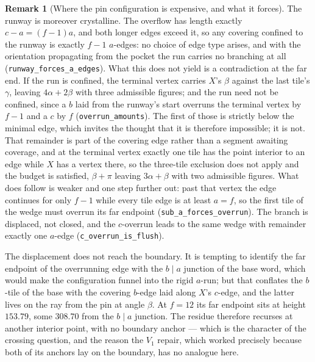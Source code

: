 \documentclass[11pt,reqno]{amsart}
\theoremstyle{plain}
\theoremstyle{definition}
\newtheorem{remark}[theorem]{Remark}
\begin{document}
\begin{remark}[Where the pin configuration is expensive, and what it forces]
The runway is moreover crystalline. The overflow has length exactly $c-a=(f-1)a$, and both longer
edges exceed it, so any covering confined to the runway is exactly $f-1$ $a$-edges: no choice of
edge type arises, and with the orientation propagating from the pocket the run carries no branching
at all (\texttt{runway\_forces\_a\_edges}). What this does not yield is a contradiction at the
far end. If the run is confined, the terminal vertex carries $X$'s $\beta$ against the last tile's
$\gamma$, leaving $4\alpha+2\beta$ with three admissible figures; and the run need not be
confined, since a $b$ laid from the runway's start overruns the terminal vertex by $f-1$ and a $c$
by $f$ (\texttt{overrun\_amounts}). The first of those is strictly below the minimal edge, which invites the thought that it is
therefore impossible; it is not. That remainder is part of the covering edge rather than a segment
awaiting coverage, and at the terminal vertex exactly one tile has the point interior to an edge
while $X$ has a vertex there, so the three-tile exclusion does not apply and the budget is
satisfied, $\beta+\pi$ leaving $3\alpha+\beta$ with two admissible figures. What does follow is
weaker and one step further out: past that vertex the edge continues for only $f-1$ while every
tile edge is at least $a=f$, so the first tile of the wedge must overrun its far endpoint
(\texttt{sub\_a\_forces\_overrun}). The branch is displaced, not closed, and the $c$-overrun
leads to the same wedge with remainder exactly one $a$-edge
(\texttt{c\_overrun\_is\_flush}).

The displacement does not reach the boundary. It is tempting to identify the far endpoint of the
overrunning edge with the $b\mid a$ junction of the base word, which would make the configuration
funnel into the rigid $a$-run; but that conflates the $b$-tile of the base with the covering
$b$-edge laid along $X$'s $c$-edge, and the latter lives on the ray from the pin at angle $\beta$.
At $f=12$ its far endpoint sits at height $153.79$, some $308.70$ from the $b\mid a$ junction. The
residue therefore recurses at another interior point, with no boundary anchor --- which is the
character of the crossing question, and the reason the $V_1$ repair, which worked precisely because
both of its anchors lay on the boundary, has no analogue here.


\end{remark}
\end{document}
